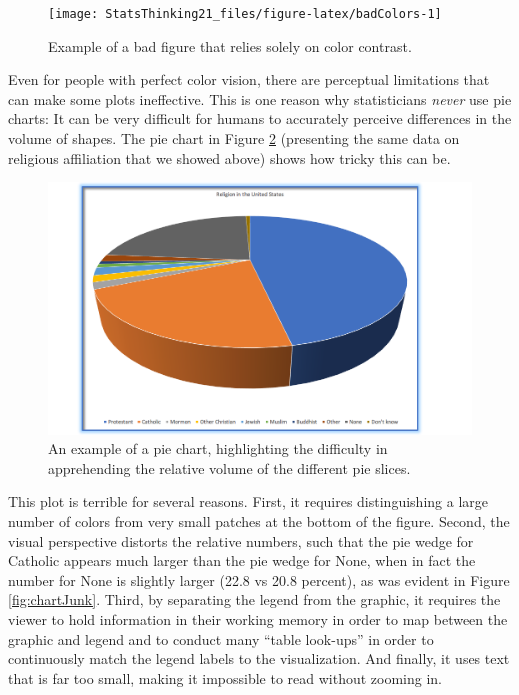 \documentclass[12pt,]{book}
\theoremstyle{definition}
\theoremstyle{definition}
\theoremstyle{definition}
\theoremstyle{remark}
\begin{document}
\begin{figure}
\texttt{[image: StatsThinking21\_files/figure-latex/badColors-1]} \caption{Example of a bad figure that relies solely on color contrast.}\label{fig:badColors}
\end{figure}

Even for people with perfect color vision, there are perceptual limitations that can make some plots ineffective. This is one reason why statisticians \emph{never} use pie charts: It can be very difficult for humans to accurately perceive differences in the volume of shapes. The pie chart in Figure \ref{fig:pieChart} (presenting the same data on religious affiliation that we showed above) shows how tricky this can be.

\begin{figure}
\includegraphics[width=14.11in,height=0.5\textheight]{images/religion_piechart} \caption{An example of a pie chart, highlighting the difficulty in apprehending the relative volume of the different pie slices.}\label{fig:pieChart}
\end{figure}

This plot is terrible for several reasons. First, it requires distinguishing a large number of colors from very small patches at the bottom of the figure. Second, the visual perspective distorts the relative numbers, such that the pie wedge for Catholic appears much larger than the pie wedge for None, when in fact the number for None is slightly larger (22.8 vs 20.8 percent), as was evident in Figure \ref{fig:chartJunk}. Third, by separating the legend from the graphic, it requires the viewer to hold information in their working memory in order to map between the graphic and legend and to conduct many ``table look-ups'' in order to continuously match the legend labels to the visualization. And finally, it uses text that is far too small, making it impossible to read without zooming in.
\end{document}
